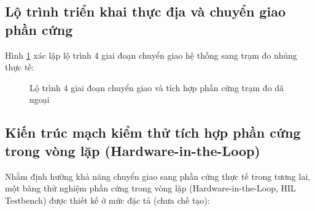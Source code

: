 \subsection{Lộ trình triển khai thực địa và chuyển giao phần cứng}

\hspace{0.5cm} Hình \ref{fig:hardware-roadmap} xác lập lộ trình 4 giai đoạn chuyển giao hệ thống sang trạm đo nhúng thực tế:

\begin{figure}[H]
\centering
{}
\caption{Lộ trình 4 giai đoạn chuyển giao và tích hợp phần cứng trạm đo dã ngoại}
\label{fig:hardware-roadmap}
\end{figure}

\subsection{Kiến trúc mạch kiểm thử tích hợp phần cứng trong vòng lặp (Hardware-in-the-Loop)}

\hspace{0.5cm} Nhằm định hướng khả năng chuyển giao sang phần cứng thực tế trong tương lai, một băng thử nghiệm phần cứng trong vòng lặp (Hardware-in-the-Loop, HIL Testbench) được thiết kế ở mức đặc tả (chưa chế tạo):

